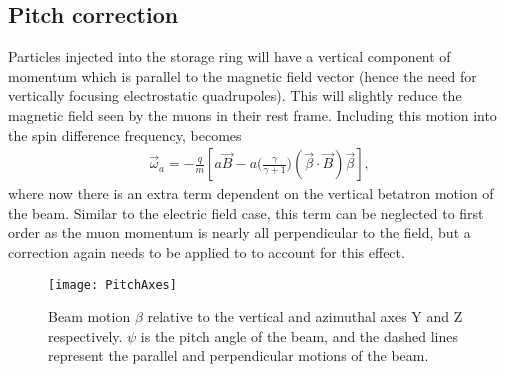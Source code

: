 


\subsection{Pitch correction}
\label{sub:pitch_correction}

Particles injected into the \gmtwo storage ring will have a vertical component of momentum which is parallel to the magnetic field vector (hence the need for vertically focusing electrostatic quadrupoles). This will slightly reduce the magnetic field seen by the muons in their rest frame. Including this motion into the spin difference frequency, \wa becomes
        \begin{align} \label{eq:wapitch}
            \vec{\omega}_{a} = -\frac{q}{m} [a\vec{B} - a \Big(\frac{\gamma}{\gamma+1}\Big)(\vec{\beta} \cdot \vec{B})\vec{\beta}],
        \end{align}
where now there is an extra term dependent on the vertical betatron motion of the beam. Similar to the electric field case, this term can be neglected to first order as the muon momentum is nearly all perpendicular to the field, but a correction again needs to be applied to \wa to account for this effect.

\begin{figure}[]
    \centering
    \texttt{[image: PitchAxes]}
    \caption[Pitching beam motion]{Beam motion $\beta$ relative to the vertical and azimuthal axes Y and Z respectively. $\psi$ is the pitch angle of the beam, and the dashed lines represent the parallel and perpendicular motions of the beam.}   
    \label{fig:PitchAxes}
\end{figure}

